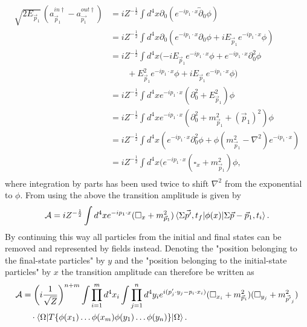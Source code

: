  \begin{equation}
	\begin{split}
		\sqrt{2E_{\vec{p}_1}}\,(a_{\vec{p}_1}^{in \dagger}-a_{\vec{p_1}}^{out\dagger})&=iZ^{-\frac{1}{2}}\int d^4x \partial_0(e^{-ip_1\cdot x}\overleftrightarrow{\partial}_0\phi)\\
		&=iZ^{-\frac{1}{2}}\int d^4x \partial_0(e^{-ip_1\cdot x}\partial_0\phi+iE_{\vec{p}_1}e^{-ip_1\cdot x}\phi)\\
		&=iZ^{-\frac{1}{2}}\int d^4x (-iE_{\vec{p}_1}e^{-ip_1\cdot x}\phi+e^{-ip_1\cdot x}\partial_0^2\phi\\
		&\qquad+E_{\vec{p}_1}^2e^{-ip_1\cdot x}\phi+iE_{\vec{p}_1}e^{-ip_1\cdot x}\phi) \\
		&=iZ^{-\frac{1}{2}}\int d^4x e^{-ip_1\cdot x}(\partial_0^2+E_{\vec{p}_1}^2)\phi \\
		&=iZ^{-\frac{1}{2}}\int d^4x e^{-ip_1\cdot x}(\partial_0^2+m_{\vec{p}_1}^2+(\vec{p}_1)^2)\phi \\
		&=iZ^{-\frac{1}{2}}\int d^4x (e^{-ip_1\cdot x}\partial_0^2\phi+\phi(m_{\vec{p}_1}^2-\nabla^2)e^{-ip_1\cdot x})\\
		&=iZ^{-\frac{1}{2}}\int d^4x (e^{-ip_1\cdot x}(\square_x+m_{\vec{p}_1}^2)\phi,\\
	\end{split}
\end{equation} 
where integration by parts has been used twice to shift $\nabla^2$ from the exponential to $\phi$. From using the above the transition amplitude is given by
\begin{equation}
	\mathcal{A}=iZ^{-\frac{1}{2}}\int d^4x e^{-ip_1\cdot x}(\square _x+m_{\vec{p}_1}^2)\braket{\Sigma\vec{p'},t_f|\phi(x)|\Sigma\vec{p}-\vec{p}_1,t_i}.
\end{equation} 
By continuing this way all particles from the initial and final states can be removed and represented by fields instead. Denoting the "position belonging to the final-state particles" by $y$ and the "position belonging to the initial-state particles" by $x$ the transition amplitude can therefore be written as
\begin{equation}
	\begin{split}
		\mathcal{A}&=\bigg(i\frac{1}{\sqrt{Z}}\bigg)^{n+m}\int\prod_{i=1}^m d^4x_i\int\prod_{j=1}^n d^4y_ie^{i(p'_j\cdot y_j-p_i\cdot x_i)}(\square _{x_i}+m_{\vec{p}_i}^2)(\square _{y_j}+m_{\vec{p'}_j}^2)\\
		&\quad\cdot\braket{\Omega|T\{\phi(x_1)\dots\phi(x_m)\phi(y_1)\dots \phi(y_n)\}|\Omega}.\\
	\end{split}
	\label{am}
\end{equation} 
